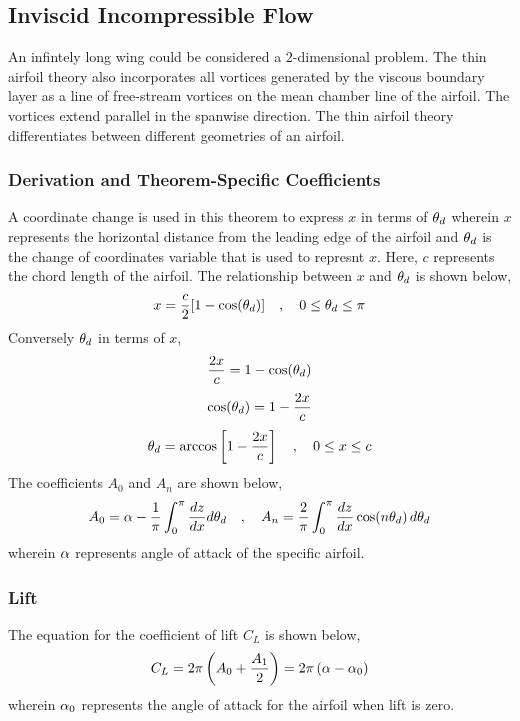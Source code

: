 \documentclass[class=report, 12pt, crop=false]{standalone}
\begin{document}
\begin{center}
\chapter{Inviscid Incompressible Flow}
\begin{comment}
\end{comment}
\begin{comment}
\end{comment}
An infintely long wing could be considered a $2$-dimensional problem. The thin airfoil theory also incorporates all vortices generated by the viscous boundary layer as a line of free-stream vortices on the mean chamber line of the airfoil. The vortices extend parallel in the spanwise direction. The thin airfoil theory differentiates between different geometries of an airfoil.
\subsection{Derivation and Theorem-Specific Coefficients}
\begin{comment}
\end{comment}
A coordinate change is used in this theorem to express $x$ in terms of $\theta_d$ wherein $x$ represents the horizontal distance from the leading edge of the airfoil and $\theta_d$ is the change of coordinates variable that is used to represnt $x$. Here, $c$ represents the chord length of the airfoil. The relationship between $x$ and $\theta_d$ is shown below,
$$x = \frac{c}{2}[1-\cos(\theta_d)]\quad,\quad 0\leq \theta_d \leq \pi$$
Conversely $\theta_d$ in terms of $x$,
$$\frac{2x}{c} = 1-\cos(\theta_d)$$
$$\cos(\theta_d)= 1-\frac{2x}{c}$$
$$\theta_d= \arccos\left[1-\frac{2x}{c}\right]\quad,\quad 0\leq x \leq c$$
The coefficients $A_0$ and $A_n$ are shown below,
$$A_0 = \alpha -\frac{1}{\pi}\int^{\pi}_{0}\frac{dz}{dx}d\theta_d\quad,\quad A_n = \frac{2}{\pi}\int^{\pi}_{0}\frac{dz}{dx}\cos(n\theta_d)\,d\theta_d$$
wherein $\alpha$ represents angle of attack of the specific airfoil.
\subsection{Lift}
\begin{comment}
\end{comment}
The equation for the coefficient of lift $C_L$ is shown below,
$$C_L = 2\pi\left(A_0 + \frac{A_1}{2}\right) = 2\pi\left(\alpha-\alpha_0\right)$$
wherein $\alpha_0$ represents the angle of attack for the airfoil when lift is zero.

\end{center}
\end{document}
